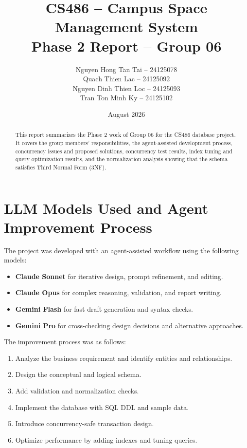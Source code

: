 \documentclass[12pt,a4paper]{article}
\title{\textbf{CS486 -- Campus Space Management System}\\[0.3cm] \Large \textbf{Phase 2 Report -- Group 06}}
\author{Nguyen Hong Tan Tai -- 24125078\\Quach Thien Lac -- 24125092\\Nguyen Dinh Thien Loc -- 24125093\\Tran Ton Minh Ky -- 24125102}
\date{August 2026}
\begin{document}
\maketitle

\begin{abstract}
This report summarizes the Phase 2 work of Group 06 for the CS486 database project. It covers the group members' responsibilities, the agent-assisted development process, concurrency issues and proposed solutions, concurrency test results, index tuning and query optimization results, and the normalization analysis showing that the schema satisfies Third Normal Form (3NF).
\end{abstract}

\newpage
\tableofcontents
\newpage


\section{LLM Models Used and Agent Improvement Process}

The project was developed with an agent-assisted workflow using the following models:

\begin{itemize}
    \item \textbf{Claude Sonnet} for iterative design, prompt refinement, and editing.
    \item \textbf{Claude Opus} for complex reasoning, validation, and report writing.
    \item \textbf{Gemini Flash} for fast draft generation and syntax checks.
    \item \textbf{Gemini Pro} for cross-checking design decisions and alternative approaches.
\end{itemize}

The improvement process was as follows:
\begin{enumerate}
    \item Analyze the business requirement and identify entities and relationships.
    \item Design the conceptual and logical schema.
    \item Add validation and normalization checks.
    \item Implement the database with SQL DDL and sample data.
    \item Introduce concurrency-safe transaction design.
    \item Optimize performance by adding indexes and tuning queries.
\end{enumerate}
\end{document}
